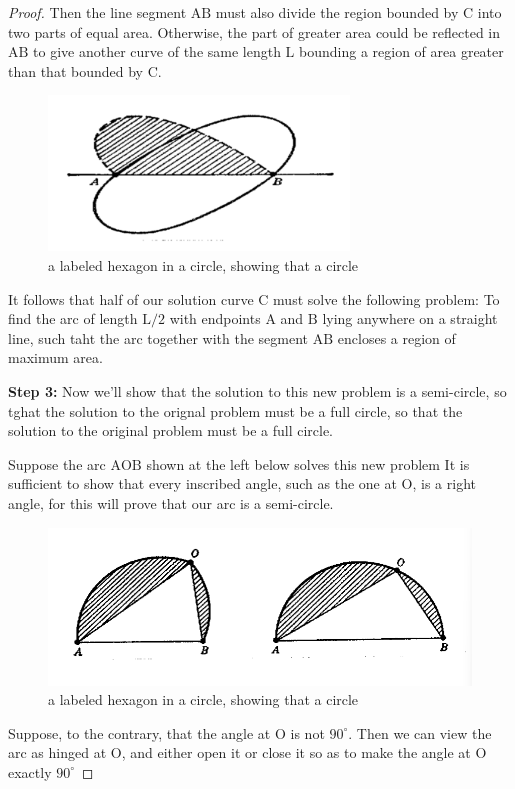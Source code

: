 \documentclass[a4paper]{book}
\numberwithin{theorem}{section}%
\begin{document}
\begin{proof}
    Then the line segment $\mathrm{AB}$ must also divide the region bounded by $\mathrm{C}$ into two parts of equal area. Otherwise, the part of greater area could be reflected in $\mathrm{AB}$ to give another curve of the same length $\mathrm{L}$ bounding a region of area greater than that bounded by $\mathrm{C}$.
    \begin{figure}[hbt!]
        \begin{center}   
            \includegraphics[width=80mm]{steiner2}
            \caption{a labeled hexagon in a circle, showing that a circle }
        \end{center}
    \end{figure}\leavevmode
    It follows that half of our solution curve $\mathrm{C}$ must solve the following problem: To find the arc of length $\mathrm{L}/2$ with endpoints $\mathrm{A}$ and $\mathrm{B}$ lying anywhere on a straight line, such taht the arc together with the segment $\mathrm{AB}$ encloses a region of maximum area.

    \textbf{Step 3:} Now we'll show that the solution to this new problem is a semi-circle, so tghat the solution to the orignal problem must be a full circle, so that the solution to the original problem must be a full circle.

    Suppose the arc $\mathrm{AOB}$ shown at the left below solves this new problem It is sufficient to show that every inscribed angle, such as the one at $\mathrm{O}$, is a right angle, for this will prove that our arc is a semi-circle.
    \begin{figure}[hbt!]
        \begin{center}   
            \includegraphics[width=130mm]{steiner3}
            \caption{a labeled hexagon in a circle, showing that a circle }
        \end{center}
    \end{figure}\leavevmode
    Suppose, to the contrary, that the angle at $\mathrm{O}$ is not $90^{\circ}$. Then we can view the arc as hinged at $\mathrm{O}$, and either open it or close it so as to make the angle at $\mathrm{O}$ exactly $90^{\circ}$


\end{proof}
\end{document}
